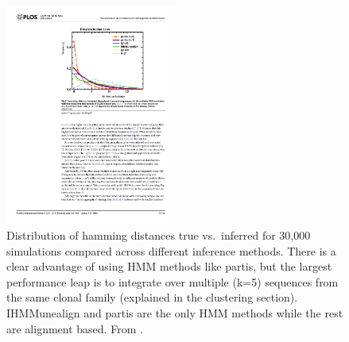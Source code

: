 \begin{figure}
    \centering
    \includegraphics[width=0.5\textwidth]{figures/partis_naiveseq_comparison.pdf}
    \caption{
        \label{fig:partis_naiveseq_comparison}
        Distribution of hamming distances true vs.\ inferred for 30,000 simulations compared across different inference methods.
        There is a clear advantage of using HMM methods like partis, but the largest performance leap is to integrate over multiple (k=5) sequences from the same clonal family (explained in the clustering section).
        IHMMunealign and partis are the only HMM methods while the rest are alignment based.
        From \cite{ralph2016consistency}.
    }
\end{figure}


